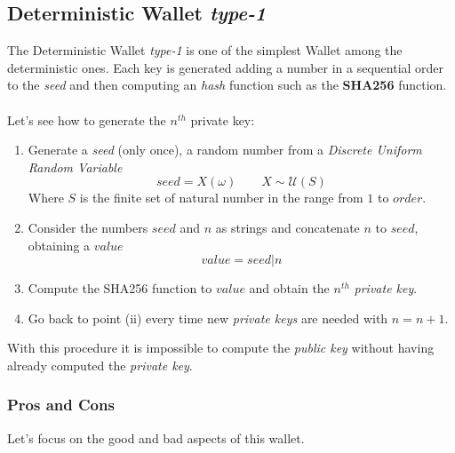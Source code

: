 \subsection{Deterministic Wallet \textit{type-1}}
The Deterministic Wallet \textit{type-1} is one of the simplest Wallet among the deterministic ones. Each key is generated adding a number in a sequential order to the \textit{seed} and then computing an \textit{hash} function such as the \textbf{SHA256} function.
\\ \\
Let's see how to generate the $n^{th}$ private key:

\begin{enumerate}[label=(\roman*)]
	\item Generate a \textit{seed} (only once), a random number from a \textit{Discrete Uniform Random Variable}
	\begin{equation*}
	seed=X(\omega) \qquad X\sim \mathcal{U}(S)
	\end{equation*}
	Where $S$ is the finite set of natural number in the range from $1$ to $order$.
	\item Consider the numbers $seed$ and $n$ as strings and concatenate $n$ to $seed$, obtaining a $value$
	\begin{equation*}
	value=seed|n
	\end{equation*}
	\item Compute the SHA256 function to $value$ and obtain the $n^{th}$ \textit{private key}.
	\item Go back to point (ii) every time new \textit{private keys} are needed with $n=n+1$. 
\end{enumerate}
With this procedure it is impossible to compute the \textit{public key} without having already computed the \textit{private key}.

\subsubsection{Pros and Cons}
Let's focus on the good and bad aspects of this wallet.

